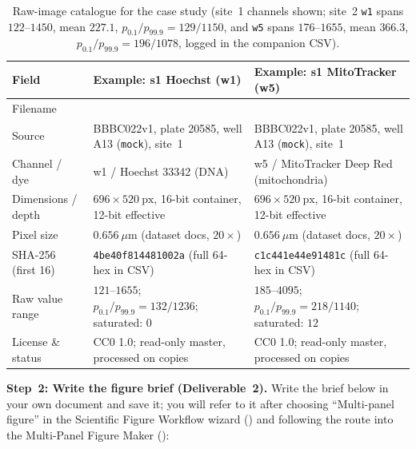 \begin{table}[htbp]\centering\footnotesize
\setlength{\tabcolsep}{3pt}
\renewcommand{\arraystretch}{1.15}
\caption{Raw-image catalogue for the case study (site~1 channels shown; site~2 \texttt{w1} spans $122\text{--}1450$, mean $227.1$, $p_{0.1}/p_{99.9}=129/1150$, and \texttt{w5} spans $176\text{--}1655$, mean $366.3$, $p_{0.1}/p_{99.9}=196/1078$, logged in the companion CSV).}\label{tab:ch08-catalog}
\begin{tabularx}{\linewidth}{@{}>{\raggedright\arraybackslash}p{25mm}YY@{}}
\toprule
\textbf{Field} & \textbf{Example: s1 Hoechst (w1)} & \textbf{Example: s1 MitoTracker (w5)} \\
\midrule
Filename &  &  \\
Source & BBBC022v1, plate 20585, well A13 (\texttt{mock}), site~1 & BBBC022v1, plate 20585, well A13 (\texttt{mock}), site~1 \\
Channel / dye & w1 / Hoechst 33342 (DNA) & w5 / MitoTracker Deep Red (mitochondria) \\
Dimensions / depth & $696 \times 520\ \text{px}$, 16-bit container, 12-bit effective & $696 \times 520\ \text{px}$, 16-bit container, 12-bit effective \\
Pixel size & $0.656\ \mu\text{m}$ (dataset docs, $20\times$) & $0.656\ \mu\text{m}$ (dataset docs, $20\times$) \\
SHA-256 (first 16) & \texttt{4be40f814481002a} (full 64-hex in CSV) & \texttt{c1c441e44e91481c} (full 64-hex in CSV) \\
Raw value range & $121\text{--}1655$; $p_{0.1}/p_{99.9}=132/1236$; saturated: $0$ & $185\text{--}4095$; $p_{0.1}/p_{99.9}=218/1140$; saturated: $12$ \\
License \& status & CC0 1.0; read-only master, processed on copies & CC0 1.0; read-only master, processed on copies \\
\bottomrule
\end{tabularx}
\end{table}

\textbf{Step~2: Write the figure brief (Deliverable~2).} Write the brief below in your own document and save it; you will refer to it after choosing ``Multi-panel figure'' in the \scidraw{} Scientific Figure Workflow wizard () and following the route into the Multi-Panel Figure Maker ():

